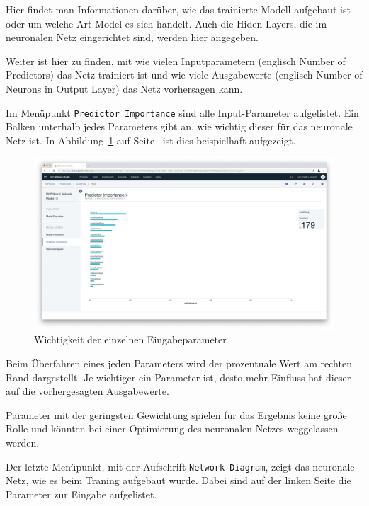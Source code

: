Hier findet man Informationen darüber, wie das trainierte Modell aufgebaut ist oder um welche Art Model es sich handelt.
Auch die Hiden Layers, die im neuronalen Netz eingerichtet sind, werden hier angegeben.

Weiter ist hier zu finden, mit wie vielen Inputparametern (englisch Number of Predictors) das Netz trainiert ist und wie
viele Ausgabewerte (englisch Number of Neurons in Output Layer) das Netz vorhersagen kann.

Im Menüpunkt \texttt{Predictor Importance} sind alle Input-Parameter aufgelistet. Ein Balken unterhalb jedes Parameters
gibt an, wie wichtig dieser für das neuronale Netz ist. In Abbildung~\ref{fig:umsetzung_model_predictor} auf
Seite~\pageref{fig:umsetzung_model_predictor} ist dies beispielhaft aufgezeigt.

\begin{figure}[h]
    \centering
    \includegraphics[width=\textwidth]{images/kapitel_3/model_predictor.png}
    \caption{Wichtigkeit der einzelnen Eingabeparameter}
    \label{fig:umsetzung_model_predictor}
\end{figure}

Beim Überfahren eines jeden Parameters wird der prozentuale Wert am rechten Rand dargestellt. Je wichtiger ein Parameter
ist, desto mehr Einfluss hat dieser auf die vorhergesagten Ausgabewerte.

Parameter mit der geringsten Gewichtung spielen für das Ergebnis keine große Rolle und könnten bei einer Optimierung des
neuronalen Netzes weggelassen werden.

Der letzte Menüpunkt, mit der Aufschrift \texttt{Network Diagram}, zeigt das neuronale Netz, wie es beim Traning
aufgebaut wurde. Dabei sind auf der linken Seite die Parameter zur Eingabe aufgelistet.

